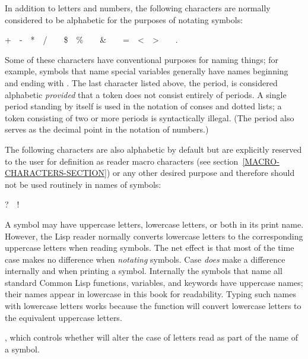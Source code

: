 In addition to letters and numbers, the following characters are normally
considered to be alphabetic for the purposes of notating
symbols:
\begin{lisp}
+~~-~~*~~/~~{\Xatsign}~~\$~~\%~~{\Xcircumflex}~~\&~~{\Xunderscore}~~=~~<~~>~~{\Xtilde}~~.
\end{lisp}
Some of these characters have conventional purposes for naming things;
for example, symbols that name special variables
generally have names beginning and ending with
\cdf{*}.  The last character listed above, the period, is considered alphabetic
\emph{provided} that a token does not consist entirely of periods.
A single period standing by itself is used in the notation
of conses and dotted lists; a token consisting of two or more periods
is syntactically illegal.  (The period also serves as the decimal point
in the notation of numbers.)

The following characters are also alphabetic by default but are explicitly
reserved to the user for definition as reader macro characters
(see section~\ref{MACRO-CHARACTERS-SECTION}) or any other desired purpose
and therefore should not be used routinely in names of symbols:
\begin{lisp}
?~~!~~{\Xlbracket}~~{\Xrbracket}~~{\Xlbrace}~~{\Xrbrace}
\end{lisp}

A symbol may have uppercase letters, lowercase letters, or both
in its print name.
However, the Lisp reader normally converts lowercase letters to
the corresponding uppercase letters when reading symbols.
The net effect is that most of the time case makes no
difference when \emph{notating} symbols.  Case \emph{does} make
a difference internally and when printing a symbol.
Internally the symbols that name all standard Common Lisp functions,
variables, and keywords have uppercase names; their names appear
in lowercase in this book for readability.  Typing such names
with lowercase letters works because the function  will convert
lowercase letters to the equivalent uppercase letters.

, which controls whether  will alter the case
of letters read as part of the name of a symbol.

